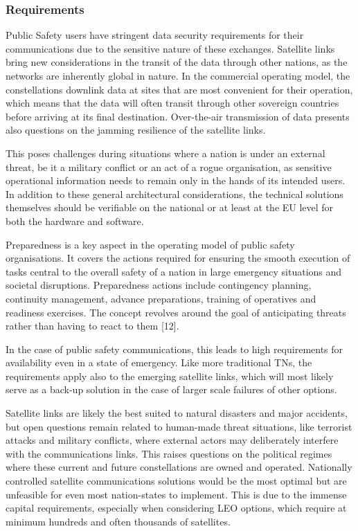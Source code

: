 \documentclass[english, 12pt, a4paper, elec, utf8, a-1b, online]{aaltothesis}
\begin{document}
\subsubsection{Requirements}

Public Safety users have stringent data security requirements for their communications due to the sensitive nature of these exchanges.
Satellite links bring new considerations in the transit of the data through other nations, as the networks are inherently global in nature.
In the commercial operating model, the constellations downlink data at sites that are most convenient for their operation, which means that the data will often transit through other sovereign countries before arriving at its final destination.
Over-the-air transmission of data presents also questions on the jamming resilience of the satellite links.

This poses challenges during situations where a nation is under an external threat, be it a military conflict or an act of a rogue organisation, as sensitive operational information needs to remain only in the hands of its intended users. In addition to these general architectural considerations, the technical solutions themselves should be verifiable on the national or at least at the EU level for both the hardware and software.

Preparedness is a key aspect in the operating model of public safety organisations. It covers the actions required for ensuring the smooth execution of tasks central to the overall safety of a nation in large emergency situations and societal disruptions. Preparedness actions include contingency planning, continuity management, advance preparations, training of operatives and readiness exercises. The concept revolves around the goal of anticipating threats rather than having to react to them [12]. %

In the case of public safety communications, this leads to high requirements for availability even in a state of emergency.
Like more traditional TNs, the requirements apply also to the emerging satellite links, which will most likely serve as a back-up solution in the case of larger scale failures of other options.

Satellite links are likely the best suited to natural disasters and major accidents, but open questions remain related to human-made threat situations, like terrorist attacks and military conflicts, where external actors may deliberately interfere with the communications links.
This raises questions on the political regimes where these current and future constellations are owned and operated. Nationally controlled satellite communications solutions would be the most optimal but are unfeasible for even most nation-states to implement. This is due to the immense capital requirements, especially when considering LEO options, which require at minimum hundreds and often thousands of satellites.
\end{document}

